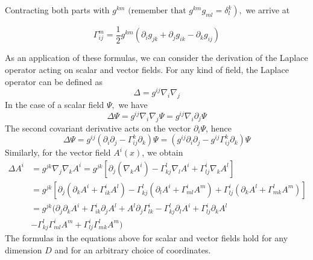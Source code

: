 Contracting both parts with $\left.g^{k m} \text { (remember that } g^{k m} g_{m l}=\delta_{l}^{k}\right),$ we arrive at
\begin{qt}
\begin{equation}
\Gamma_{i j}^{m}=\frac{1}{2} g^{k m}\left(\partial_{i} g_{j k}+\partial_{j} g_{i k}-\partial_{k} g_{i j}\right)
\end{equation}
\end{qt}
As an application of these formulas, we can consider the derivation of the Laplace operator acting on scalar and vector fields. For any kind of field, the Laplace operator can be defined as
\begin{equation}
\Delta=g^{i j} \nabla_{i} \nabla_{j}
\end{equation}
In the case of a scalar field $\Psi,$ we have
\begin{equation}
\Delta \Psi=g^{i j} \nabla_{i} \nabla_{j} \Psi=g^{i j} \nabla_{i} \partial_{j} \Psi
\end{equation}
The second covariant derivative acts on the vector $\partial_i\Psi$, hence
\begin{equation}
\Delta \Psi=g^{i j}\left(\partial_{i} \partial_{j}-\Gamma_{i j}^{k} \partial_{k}\right) \Psi=\left(g^{i j} \partial_{i} \partial_{j}-g^{i j} \Gamma_{i j}^{k} \partial_{k}\right) \Psi
\end{equation}
Similarly, for the vector field $A^i(x)$, we obtain
\begin{equation}
\begin{split}
    \Delta A^{i}&=g^{j k} \nabla_{j} \nabla_{k} A^{i}=g^{j k}\left[\partial_{j}\left(\nabla_{k} A^{i}\right)-\Gamma_{k j}^{l} \nabla_{l} A^{i}+\Gamma_{l j}^{i} \nabla_{k} A^{l}\right]\\
    &=g^{j k}[\partial_{j}\left(\partial_{k} A^{i}+\Gamma_{i k}^{i} A^{l}\right)-\Gamma_{k j}^{l}\left(\partial_{l} A^{i}+\Gamma_{m l}^{i} A^{m}\right)+\Gamma_{l j}^{i}\left(\partial_{k} A^{l}+\Gamma_{m k}^{l} A^{m}\right)]\\
    &=g^{j k}(\partial_{j} \partial_{k} A^{i}+\Gamma_{i k}^{i} \partial_{j} A^{l}+A^{l} \partial_{j} \Gamma_{l k}^{i}-\Gamma_{k j}^{l} \partial_{l} A^{i}+\Gamma_{l j}^{i} \partial_{k} A^{l}\\
    &-\Gamma_{k j}^{l} \Gamma_{m l}^{i} A^{m}+\Gamma_{l j}^{i} \Gamma_{m k}^{l} A^{m})
\end{split}
\end{equation}
The formulas in the equations above for scalar and vector fields hold for any dimension $D$ and for an arbitrary choice of coordinates.
